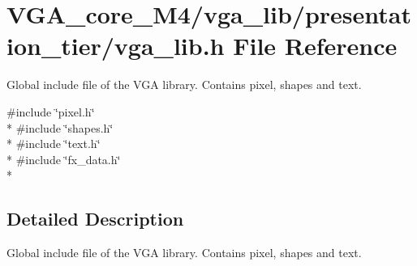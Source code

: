 \section{V\+G\+A\+\_\+core\+\_\+\+M4/vga\+\_\+lib/presentation\+\_\+tier/vga\+\_\+lib.h File Reference}
\label{vga__lib_8h}


Global include file of the V\+GA library. Contains pixel, shapes and text.  


{\ttfamily \#include \char`\"{}pixel.\+h\char`\"{}}\\*
{\ttfamily \#include \char`\"{}shapes.\+h\char`\"{}}\\*
{\ttfamily \#include \char`\"{}text.\+h\char`\"{}}\\*
{\ttfamily \#include \char`\"{}fx\+\_\+data.\+h\char`\"{}}\\*


\subsection{Detailed Description}
Global include file of the V\+GA library. Contains pixel, shapes and text. 

